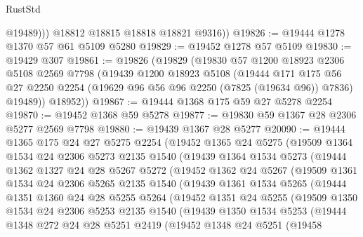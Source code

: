 \begin{lexlean}{RustStd}
\begin{coremodule}
              @19489)))
        @18812
        @18815
        @18818
        @18821
        @9316))
@19826 := @19444 @1278 @1370 @57 @61 @5109 @5280
@19829 := @19452 @1278 @57 @5109
@19830 := @19429 @307
@19861 := @19826
    (@19829
      (@19830
        @57
        @1200
        @18923
        @2306
        @5108
        @2569
        @7798
        (@19439
          @1200
          @18923
          @5108
          (@19444
            @171
            @175
            @56
            @27
            @2250
            @2254
            (@19629 @96 @56 @96 @2250 (@7825 (@19634 @96)) @7836)
            @19489))
        @18952))
@19867 := @19444 @1368 @175 @59 @27 @5278 @2254
@19870 := @19452 @1368 @59 @5278
@19877 := @19830 @59 @1367 @28 @2306 @5277 @2569 @7798
@19880 := @19439 @1367 @28 @5277
@20090 := @19444
    @1365
    @175
    @24
    @27
    @5275
    @2254
    (@19452
      @1365
      @24
      @5275
      (@19509
        @1364
        @1534
        @24
        @2306
        @5273
        @2135
        @1540
        (@19439
          @1364
          @1534
          @5273
          (@19444
            @1362
            @1327
            @24
            @28
            @5267
            @5272
            (@19452
              @1362
              @24
              @5267
              (@19509
                @1361
                @1534
                @24
                @2306
                @5265
                @2135
                @1540
                (@19439
                  @1361
                  @1534
                  @5265
                  (@19444
                    @1351
                    @1360
                    @24
                    @28
                    @5255
                    @5264
                    (@19452
                      @1351
                      @24
                      @5255
                      (@19509
                        @1350
                        @1534
                        @24
                        @2306
                        @5253
                        @2135
                        @1540
                        (@19439
                          @1350
                          @1534
                          @5253
                          (@19444
                            @1348
                            @272
                            @24
                            @28
                            @5251
                            @2419
                            (@19452
                              @1348
                              @24
                              @5251
                              (@19458

\end{coremodule}
\end{lexlean}
